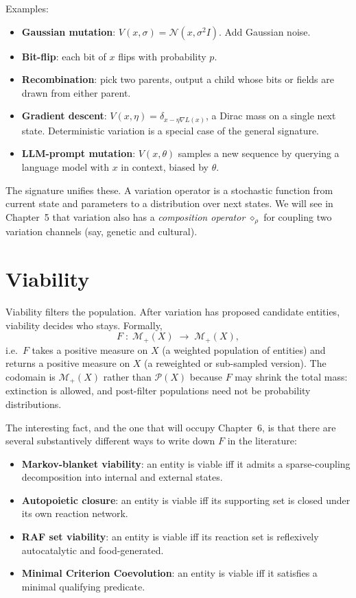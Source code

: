 Examples:

\begin{itemize}[leftmargin=1.5em,itemsep=2pt]
  \item \textbf{Gaussian mutation}: $V(x, \sigma) = \mathcal{N}(x,
    \sigma^2 I)$. Add Gaussian noise.
  \item \textbf{Bit-flip}: each bit of $x$ flips with probability $p$.
  \item \textbf{Recombination}: pick two parents, output a child whose
    bits or fields are drawn from either parent.
  \item \textbf{Gradient descent}: $V(x, \eta) = \delta_{x - \eta \nabla
    L(x)}$, a Dirac mass on a single next state. Deterministic variation
    is a special case of the general signature.
  \item \textbf{LLM-prompt mutation}: $V(x, \theta)$ samples a new
    sequence by querying a language model with $x$ in context, biased by
    $\theta$.
\end{itemize}

The signature unifies these. A variation operator is a stochastic
function from current state and parameters to a distribution over next
states. We will see in Chapter~5 that variation also has a
\emph{composition operator} $\diamond_\rho$ for coupling two variation
channels (say, genetic and cultural).

\section{Viability}

Viability filters the population. After variation has proposed candidate
entities, viability decides who stays. Formally,
\[
  F \;:\; \mathcal{M}_+(X) \;\to\; \mathcal{M}_+(X),
\]
i.e.\ $F$ takes a positive measure on $X$ (a weighted population of
entities) and returns a positive measure on $X$ (a reweighted or
sub-sampled version). The codomain is $\mathcal{M}_+(X)$ rather than
$\mathcal{P}(X)$ because $F$ may shrink the total mass: extinction is
allowed, and post-filter populations need not be probability
distributions.

The interesting fact, and the one that will occupy Chapter~6, is that
there are several substantively different ways to write down $F$ in the
literature:

\begin{itemize}[leftmargin=1.5em,itemsep=2pt]
  \item \textbf{Markov-blanket viability}: an entity is viable iff it
    admits a sparse-coupling decomposition into internal and external
    states.
  \item \textbf{Autopoietic closure}: an entity is viable iff its
    supporting set is closed under its own reaction network.
  \item \textbf{RAF set viability}: an entity is viable iff its
    reaction set is reflexively autocatalytic and food-generated.
  \item \textbf{Minimal Criterion Coevolution}: an entity is viable iff
    it satisfies a minimal qualifying predicate.
\end{itemize}

